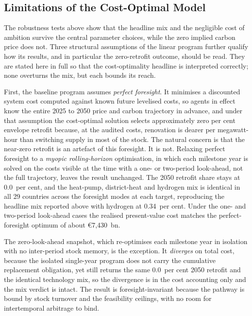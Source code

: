 \subsection{Limitations of the Cost-Optimal Model}
The robustness tests above show that the headline mix and the negligible cost of
ambition survive the central parameter choices, while the zero implied carbon price
does not. Three structural assumptions of the linear program further qualify how
its results, and in particular the zero-retrofit outcome, should be read. They are
stated here in full so that the cost-optimality headline is interpreted correctly;
none overturns the mix, but each bounds its reach.

First, the baseline program assumes \emph{perfect foresight}. It minimises a
discounted system cost computed against known future levelised costs, so agents in
effect know the entire 2025 to 2050 price and carbon trajectory in advance, and
under that assumption the cost-optimal solution selects approximately zero per cent
envelope retrofit because, at the audited costs, renovation is dearer per
megawatt-hour than switching supply in most of the stock. The natural
concern is that the near-zero retrofit is an artefact of this foresight. It is not.
Relaxing perfect foresight to a \emph{myopic rolling-horizon} optimisation, in which
each milestone year is solved on the costs visible at the time with a one- or
two-period look-ahead, not the full trajectory, leaves the result unchanged. The 2050 retrofit share stays at 0.0~per cent, and the heat-pump, district-heat and hydrogen mix is identical in all 29 countries across
the foresight modes at each target, reproducing the headline mix reported above with hydrogen at 0.34~per cent. Under the one- and two-period look-ahead cases the realised present-value cost matches the perfect-foresight optimum of about \euro{}7{,}430~bn.

The zero-look-ahead snapshot, which re-optimises each
milestone year in isolation with no inter-period stock memory, is the exception. It
\emph{diverges} on total cost, because the isolated single-year program does not
carry the cumulative replacement obligation, yet still returns the same 0.0~per cent 2050 retrofit and the identical technology mix, so the divergence is in the cost accounting
only and the mix verdict is intact. The result is foresight-invariant because the pathway is
bound by stock turnover and the feasibility ceilings, with no room for intertemporal arbitrage to bind.

